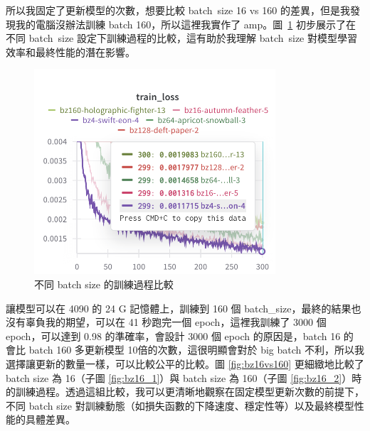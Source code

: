所以我固定了更新模型的次數，想要比較 batch\ size 16 vs 160 的差異，但是我發現我的電腦沒辦法訓練 batch 160，所以這裡我實作了 amp。圖~\ref{fig:different_bz} 初步展示了在不同 batch\ size 設定下訓練過程的比較，這有助於我理解 batch\ size 對模型學習效率和最終性能的潛在影響。

\begin{figure}[H]
    \centering
    \includegraphics[width=0.8\textwidth]{figures/different_bz.png}
    \caption{不同 batch size 的訓練過程比較}
    \label{fig:different_bz}
\end{figure}

讓模型可以在 4090 的 24 G 記憶體上，訓練到 160 個 batch\_size，最終的結果也沒有辜負我的期望，可以在 41 秒跑完一個 epoch，這裡我訓練了 3000 個 epoch，可以達到 0.98 的準確率，會設計 3000 個 epoch 的原因是，batch 16 的 會比 batch 160 多更新模型 10倍的次數，這很明顯會對於 big batch 不利，所以我選擇讓更新的數量一樣，可以比較公平的比較。圖 \ref{fig:bz16vs160} 更細緻地比較了 batch size 為 16（子圖 \ref{fig:bz16_1}）與 batch size 為 160（子圖 \ref{fig:bz16_2}）時的訓練過程。透過這組比較，我可以更清晰地觀察在固定模型更新次數的前提下，不同 batch size 對訓練動態（如損失函數的下降速度、穩定性等）以及最終模型性能的具體差異。

